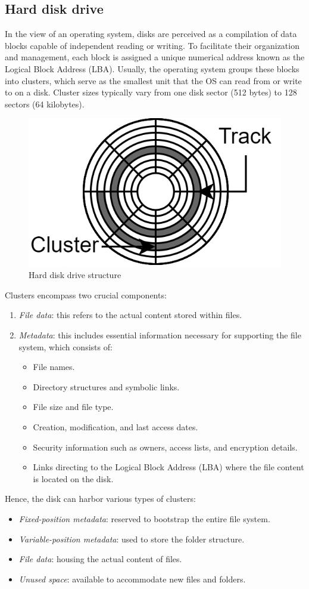 \subsection{Hard disk drive}
In the view of an operating system, disks are perceived as a compilation of data blocks capable of independent reading or writing. 
To facilitate their organization and management, each block is assigned a unique numerical address known as the Logical Block Address (LBA). 
Usually, the operating system groups these blocks into clusters, which serve as the smallest unit that the OS can read from or write to on a disk. 
Cluster sizes typically vary from one disk sector (512 bytes) to 128 sectors (64 kilobytes).
\begin{figure}[H]
    \centering
    \includegraphics[width=0.4\linewidth]{images/hdd.png}
    \caption{Hard disk drive structure}
\end{figure}
Clusters encompass two crucial components:
\begin{enumerate}
    \item \textit{File data}: this refers to the actual content stored within files.
    \item \textit{Metadata}: this includes essential information necessary for supporting the file system, which consists of:
        \begin{itemize}
            \item File names.
            \item Directory structures and symbolic links.
            \item File size and file type.
            \item Creation, modification, and last access dates.
            \item Security information such as owners, access lists, and encryption details.
            \item Links directing to the Logical Block Address (LBA) where the file content is located on the disk.
        \end{itemize}
\end{enumerate}
Hence, the disk can harbor various types of clusters:
\begin{itemize}
    \item \textit{Fixed-position metadata}: reserved to bootstrap the entire file system.
    \item \textit{Variable-position metadata}: used to store the folder structure.
    \item \textit{File data}: housing the actual content of files.
    \item \textit{Unused space}: available to accommodate new files and folders.
\end{itemize}











